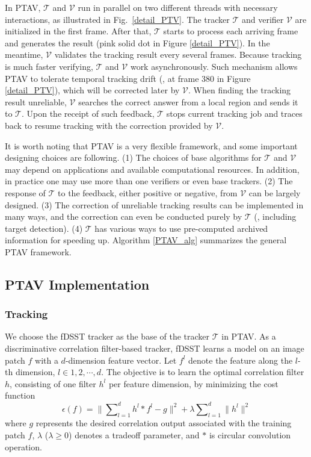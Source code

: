 \documentclass[10pt,twocolumn,letterpaper]{article}
\def \TK{\mathcal{T}}
\def \VF{\mathcal{V}}
\begin{document}
In PTAV, $\TK$ and $\VF$ run in parallel on two different threads with necessary interactions, as illustrated in Fig.~\ref{detail_PTV}. The tracker $\TK$ and verifier $\VF$ are initialized in the first frame. After that, $\TK$ starts to process each arriving frame and generates the result (pink solid dot in Figure \ref{detail_PTV}). In the meantime, $\VF$ validates the tracking result every several frames. Because tracking is much faster verifying, $\TK$ and $\VF$ work asynchronously. Such mechanism allows PTAV to tolerate temporal tracking drift (\eg, at frame 380 in Figure \ref{detail_PTV}), which will be corrected later by $\VF$. When finding the tracking result unreliable, $\VF$ searches the correct answer from a local region and sends it to $\TK$. Upon the receipt of such feedback, $\TK$ stops current tracking job and traces back to resume tracking with the correction provided by $\VF$.

It is worth noting that PTAV is a very flexible framework, and some important designing choices are following. (1) The choices of base algorithms for $\TK$ and $\VF$ may depend on applications and available computational resources. In addition, in practice one may use more than one verifiers or even base trackers. (2) The response of $\TK$ to the feedback, either positive or negative, from $\VF$ can be largely designed. (3) The correction of unreliable tracking results can be implemented in many ways, and the correction can even be conducted purely by $\TK$ (\ie, including target detection). (4) $\TK$ has various ways to use pre-computed archived information for speeding up. Algorithm \ref{PTAV_alg} summarizes the general PTAV framework.

\subsection{PTAV Implementation}

\subsubsection{Tracking}

We choose the fDSST tracker \cite{danelljan2016discriminative} as the base of the tracker $\TK$ in PTAV. As a discriminative correlation filter-based tracker, fDSST learns a model on an image patch $f$ with a $d$-dimension feature vector. Let $f^{l}$ denote the feature along the $l$-th dimension, $l\in{1,2,\cdots,d}$. The objective is to learn the optimal correlation filter $h$, consisting of one filter $h^{l}$ per feature dimension, by minimizing the cost function
\begin{equation}
\epsilon(f) = \Big\|{\sum\nolimits_{l=1}^{d}{h^{l}*f^{l}}-g} \Big\|^{2} + \lambda\sum\nolimits_{l=1}^{d}{\parallel{h^{l}}\parallel^{2}}\label{eq1}
\end{equation}
where $g$ represents the desired correlation output associated with the training patch $f$, $\lambda$ ($\lambda\geqslant{0}$) denotes a tradeoff parameter, and $*$ is circular convolution operation.
\end{document}
